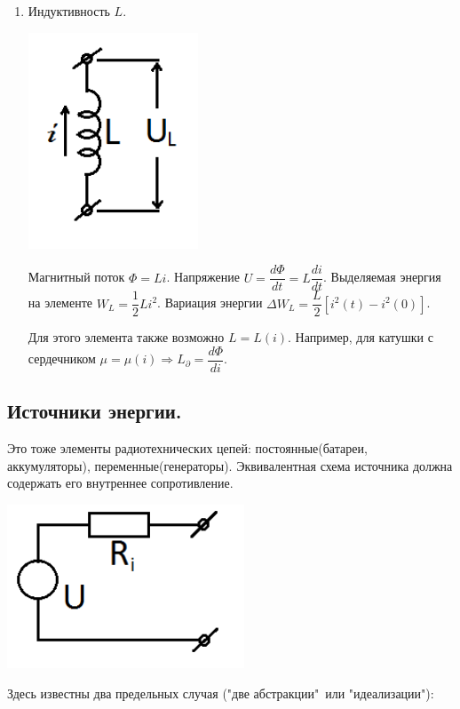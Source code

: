 \documentclass[../main/main.tex]{subfiles}
\begin{document}
\begin{enumerate}
    \item Индуктивность $L$.
    
\begin{minipage}{6cm}
\centering
\includegraphics[scale=0.6]{../section01/images/inductance/inductance.png} %
\end{minipage} \hfill   
\begin{minipage}{11cm}
    Магнитный поток $\Phi = Li$. Напряжение $U = \dfrac{d\Phi}{dt} = L \dfrac{di}{dt}$. Выделяемая энергия на элементе $W_L = \dfrac{1}{2} Li^2$. Вариация энергии $\Delta W_L = \dfrac{L}{2} [i^2(t) - i^2(0)]$.
\end{minipage}
    
    Для этого элемента также возможно $L = L(i)$. Например, для катушки с сердечником $\mu = \mu(i) \Rightarrow L_\partial = \dfrac{d\Phi}{di}$.
\end{enumerate}

\subsection{Источники энергии.}

Это тоже элементы радиотехнических цепей: постоянные(батареи, аккумуляторы), переменные(генераторы). Эквивалентная схема источника должна содержать его внутреннее сопротивление.
 
\begin{minipage}{6cm}
\centering
\includegraphics[scale=0.7]{../section01/images/not_ideal_voltage/not_ideal_voltage.png} %
\end{minipage} \hfill   
\begin{minipage}{11cm}
Здесь известны два предельных случая ("две абстракции"\ или "идеализации"):
\end{minipage}
\end{document}
